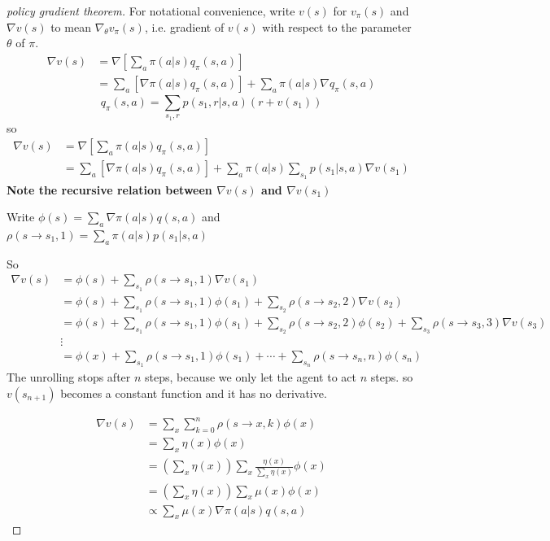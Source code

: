 \documentclass{article}
\begin{document}
\begin{proof}[policy gradient theorem]
  For notational convenience, write $v(s)$ for $v_{\pi}(s)$ and 
  $\nabla v(s)$ to mean $\nabla_{\theta}v_{\pi}(s)$, i.e. gradient
  of $v(s)$ with respect to the parameter $\theta$ of $\pi$.
  \begin{align*}
    \nabla v(s) & = \nabla [\sum_{a}\pi(a|s)q_{\pi}(s,a)] \\ 
        & = \sum_{a}[\nabla \pi(a|s)q_{\pi}(s,a)] + 
        \sum_a \pi(a|s) \nabla q_{\pi}(s,a) 
  \end{align*}
  \[
    q_{\pi}(s,a) = \sum_{s_1, r} p(s_1, r|s,a)(r + v(s_1))
  \]
  so 
  \begin{align*}
    \nabla v(s) & = \nabla [\sum_{a}\pi(a|s)q_{\pi}(s,a)] \\ 
        & = \sum_{a}[\nabla \pi(a|s)q_{\pi}(s,a)] + 
        \sum_a \pi(a|s) \sum_{s_1}p(s_1|s,a)\nabla v(s_1)
  \end{align*}
  \textbf{Note the recursive relation between $\nabla v(s)$ and $\nabla v(s_1)$}

  Write $\phi(s)= \sum_a \nabla \pi(a|s)q(s,a)$ and 
  $\rho(s\rightarrow s_1, 1) = \sum_a \pi(a|s)p(s_1|s,a)$ 

  So 
  \begin{align*}
    \nabla v(s) & = \phi(s) + \sum_{s_1}\rho(s\rightarrow s_1,1)\nabla v(s_1) \\
      & = \phi(s) + \sum_{s_1}\rho(s\rightarrow s_1,1)\phi(s_1) + 
      \sum_{s_2}\rho(s\rightarrow s_2,2)\nabla v(s_2) \\
      & = \phi(s) + \sum_{s_1}\rho(s\rightarrow s_1,1)\phi(s_1) + 
      \sum_{s_2}\rho(s\rightarrow s_2,2)\phi(s_2) + 
      \sum_{s_3}\rho(s\rightarrow s_3,3)\nabla v(s_3) \\ 
      & \vdots \\
      & = \phi(x) + \sum_{s_1}\rho(s\rightarrow s_1,1)\phi(s_1) + \cdots + 
      \sum_{s_n}\rho(s\rightarrow s_n,n)\phi(s_n)
  \end{align*}
  The unrolling stops after $n$ steps, because we only let the agent to 
  act $n$ steps. so $v(s_{n+1})$ becomes a constant function and it has no
  derivative.

  \begin{align*}
    \nabla v(s) & = \sum_x \sum_{k=0}^{n} \rho(s\rightarrow x, k)\phi(x) \\
      & = \sum_x \eta(x) \phi(x) \\
      & = (\sum_x \eta(x))\sum_x \frac{\eta(x)}{\sum_x \eta(x)} \phi(x) \\
      & = (\sum_x \eta(x)) \sum_x \mu(x)\phi(x) \\
      & \propto \sum_x \mu(x) \nabla\pi(a|s)q(s,a) 
  \end{align*}
\end{proof}
\end{document}

